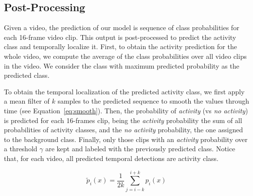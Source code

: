 \documentclass{article}
\begin{document}

\subsection{Post-Processing}
Given a video, the prediction of our model is sequence of class probabilities for each 16-frame video clip. This output is post-processed to predict the activity class and temporally localize it.
First, to obtain the activity prediction for the whole video, we compute the average of the class probabilities over all video clips in the video.
We consider the class with maximum predicted probability as the predicted class.



To obtain the temporal localization of the predicted activity class, we first apply a mean filter of $k$ samples to the predicted sequence to smooth the values through time (see Equation~\ref{eq:smooth}).
Then, the probability of \textit{activity} (vs \textit{no activity}) is predicted for each 16-frames clip, being the \textit{activity} probability the sum of all probabilities of activity classes, and the \textit{no activity} probability, the one assigned to the background class.
Finally, only those clips with an \textit{activity} probability over a threshold $\gamma$ are kept and labeled with the previously predicted class.
Notice that, for each video, all predicted temporal detections are activity class.

\begin{equation}
	\tilde{p}_i(x) = \frac{1}{2k} \sum_{j=i-k}^{i+k} p_i(x)
    \label{eq:smooth}
\end{equation}

\end{document}
